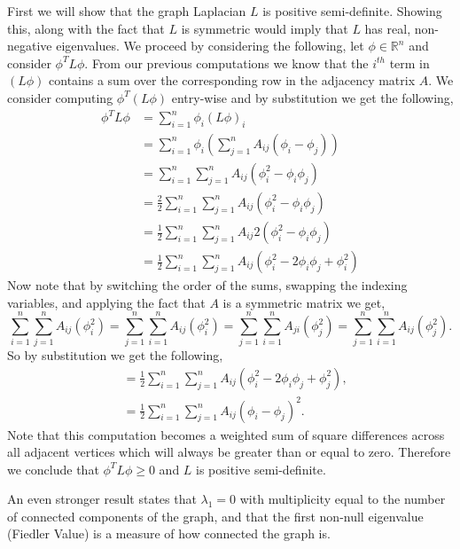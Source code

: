 \documentclass[11pt]{article}
\begin{document}
First we will show that the graph Laplacian $L$ is positive semi-definite. Showing this, along with the fact that $L$ is symmetric would imply that 
$L$ has real, non-negative eigenvalues. We proceed by considering the following, let $\phi \in \mathbb{R}^n$ and consider $\phi^TL\phi$. From our previous computations we know 
that the $i^{th}$ term in $(L\phi)$ contains a sum over the corresponding row in the adjacency matrix $A$. We consider computing $\phi^T(L\phi)$ entry-wise and by substitution we get the following, 
\begin{align*}
    \phi^TL\phi &= \sum_{i = 1}^n \phi_i (L\phi)_i\\
     &= \sum_{i = 1}^n \phi_i \left(\sum_{j = 1}^n A_{ij}(\phi_i - \phi_j)\right)\\
     &= \sum_{i = 1}^n \sum_{j = 1}^n A_{ij}(\phi_i^2 - \phi_i\phi_j)\\
     &= \frac{2}{2}\sum_{i = 1}^n \sum_{j = 1}^n A_{ij}(\phi_i^2 - \phi_i\phi_j)\\
     &= \frac{1}{2}\sum_{i = 1}^n \sum_{j = 1}^n A_{ij}2(\phi_i^2 - \phi_i\phi_j)\\
     &= \frac{1}{2}\sum_{i = 1}^n \sum_{j = 1}^n A_{ij}(\phi_i^2 - 2\phi_i\phi_j + \phi_i^2)
\end{align*}
Now note that by switching the order of the sums, swapping the indexing variables, and applying the fact that $A$ is a symmetric matrix we get, 
\begin{equation*}
    \sum_{i = 1}^n\sum_{j = 1}^n A_{ij}(\phi_i^2) =
    \sum_{j = 1}^n\sum_{i = 1}^n A_{ij}(\phi_i^2) =
    \sum_{j = 1}^n\sum_{i = 1}^n A_{ji}(\phi_j^2) =
    \sum_{j = 1}^n\sum_{i = 1}^n A_{ij}(\phi_j^2).
\end{equation*}
So by substitution we get the following, 
\begin{align*}
     &= \frac{1}{2}\sum_{i = 1}^n \sum_{j = 1}^n A_{ij}(\phi_i^2 - 2\phi_i\phi_j + \phi_j^2),\\
     &= \frac{1}{2}\sum_{i = 1}^n \sum_{j = 1}^n A_{ij}(\phi_i - \phi_j)^2.
\end{align*}
Note that this computation becomes a weighted sum of square differences across all adjacent vertices which will always be greater than or equal to zero. Therefore 
we conclude that $\phi^TL\phi \geq 0$ and $L$ is positive semi-definite. 

An even stronger result states that $\lambda_1 = 0$ with multiplicity equal to the number of connected components of the graph, and that the first non-null
eigenvalue (Fiedler Value) is a measure of how connected the graph is.\cite{Poignard} 
\end{document}
